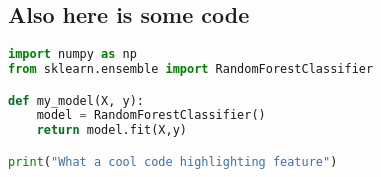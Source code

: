 \blindtext
\blindtext


\subsection{Also here is some code}

\begin{lstlisting}[language=python]
import numpy as np
from sklearn.ensemble import RandomForestClassifier

def my_model(X, y):
    model = RandomForestClassifier()
    return model.fit(X,y)

print("What a cool code highlighting feature")

\end{lstlisting}
